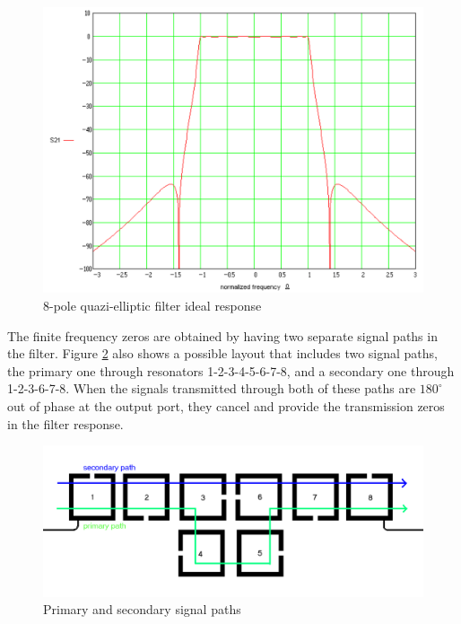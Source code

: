 \begin{figure}[ht]
\begin{center}
\includegraphics[scale=0.5]{fig/quazi-elliptic-8-pole-ideal.pdf}
\end{center}
\caption{8-pole quazi-elliptic filter ideal response}
\label{figure:quazi-elliptic-8-pole-ideal}

\end{figure}
The finite frequency zeros are obtained by having two separate signal paths in the filter. Figure \ref{figure:signal-paths} also shows a possible layout that includes two signal paths, the primary one through resonators 1-2-3-4-5-6-7-8, and a secondary one through 1-2-3-6-7-8. When the signals transmitted through both of these paths are $180^\circ$ out of phase at the output port, they cancel and provide the transmission zeros in the filter response.

\begin{figure}
\begin{center}
\includegraphics[scale=0.3]{fig/quazi-elliptic-8-pole-layout-path.pdf}
\end{center}
\caption{Primary and secondary signal paths}
\label{figure:signal-paths}
\end{figure}


